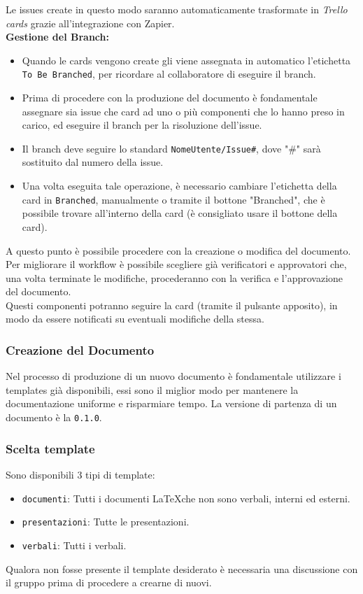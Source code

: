 \noindent Le issues create in questo modo saranno automaticamente trasformate in \textit{Trello cards} grazie all'integrazione con Zapier. \\

\noindent \textbf{Gestione del Branch:}
\begin{itemize}
    \item Quando le cards vengono create gli viene assegnata in automatico 
    l'etichetta \texttt{To Be Branched}, per ricordare al collaboratore di 
    eseguire il branch.
    \item Prima di procedere con la produzione del documento è fondamentale 
    assegnare sia issue che card ad uno o più componenti che lo hanno preso in carico, 
    ed eseguire il branch per la risoluzione dell'issue.
    \item Il branch deve seguire lo standard \texttt{NomeUtente/Issue\#}, 
    dove "\#" sarà sostituito dal numero della issue.
    \item Una volta eseguita tale operazione, è necessario cambiare l'etichetta 
    della card in \texttt{Branched}, manualmente o tramite il 
    bottone "Branched", che è possibile trovare all'interno della card (è consigliato usare il bottone della card).
\end{itemize}
\noindent A questo punto è possibile procedere con la creazione o modifica del documento.
Per migliorare il workflow è possibile scegliere già verificatori e 
approvatori che, una volta terminate le modifiche, procederanno con la 
verifica e l'approvazione del documento.\\ 
Questi componenti potranno seguire la card (tramite il pulsante apposito), 
in modo da essere notificati su eventuali modifiche della stessa.

\subsubsection{Creazione del Documento}
Nel processo di produzione di un nuovo documento è fondamentale utilizzare i templates già
disponibili, essi sono il miglior modo per mantenere la documentazione uniforme e
risparmiare tempo.
La versione di partenza di un documento è la \texttt{0.1.0}.

\subsubsection{Scelta template}

Sono disponibili 3 tipi di template:
\begin{itemize}
    \item \texttt{documenti}: Tutti i documenti \LaTeX che non sono verbali, interni ed esterni.
    \item \texttt{presentazioni}: Tutte le presentazioni.
    \item \texttt{verbali}: Tutti i verbali.
\end{itemize}
Qualora non fosse presente il template desiderato è necessaria una discussione con il gruppo prima di procedere a crearne di nuovi.

